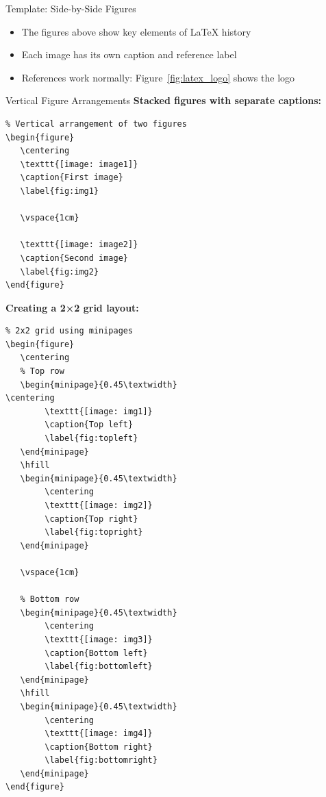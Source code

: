\begin{frame}{Template: Side-by-Side Figures}
     \begin{itemize}
          \item The figures above show key elements of LaTeX history
          \item Each image has its own caption and reference label
          \item References work normally: Figure~\ref{fig:latex_logo} shows the logo
     \end{itemize}
\end{frame}

\begin{frame}[fragile]{Vertical Figure Arrangements}
     \textbf{Stacked figures with separate captions:}
     \begin{lstlisting}
% Vertical arrangement of two figures
\begin{figure}
   \centering
   \texttt{[image: image1]}
   \caption{First image}
   \label{fig:img1}
   
   \vspace{1cm}
   
   \texttt{[image: image2]}
   \caption{Second image}
   \label{fig:img2}
\end{figure}
     \end{lstlisting}
     
     \textbf{Creating a 2×2 grid layout:}
     \begin{lstlisting}
% 2x2 grid using minipages
\begin{figure}
   \centering
   % Top row
   \begin{minipage}{0.45\textwidth}
\centering
        \texttt{[image: img1]}
        \caption{Top left}
        \label{fig:topleft}
   \end{minipage}
   \hfill
   \begin{minipage}{0.45\textwidth}
        \centering
        \texttt{[image: img2]}
        \caption{Top right}
        \label{fig:topright}
   \end{minipage}
   
   \vspace{1cm}
   
   % Bottom row
   \begin{minipage}{0.45\textwidth}
        \centering
        \texttt{[image: img3]}
        \caption{Bottom left}
        \label{fig:bottomleft}
   \end{minipage}
   \hfill
   \begin{minipage}{0.45\textwidth}
        \centering
        \texttt{[image: img4]}
        \caption{Bottom right}
        \label{fig:bottomright}
   \end{minipage}
\end{figure}
     \end{lstlisting}
\end{frame}
